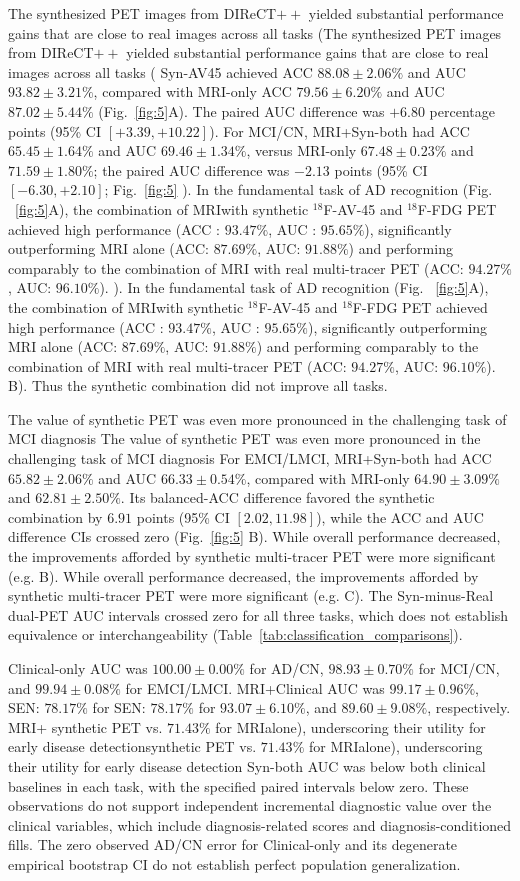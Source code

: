 \documentclass{article}
\providecommand{\DIFaddtex}[1]{{\protect\color{blue} \sf #1}} %
\providecommand{\DIFdeltex}[1]{{\protect\color{red} \ifmmode #1\else\scriptsize #1\fi}} %
\providecommand{\DIFaddbegin}{} %
\providecommand{\DIFaddend}{} %
\providecommand{\DIFdelbegin}{} %
\providecommand{\DIFdelend}{} %
\providecommand{\DIFadd}[1]{\texorpdfstring{\DIFaddtex{#1}}{#1}} %
\providecommand{\DIFdel}[1]{\texorpdfstring{\DIFdeltex{#1}}{}} %
\newcommand{\DIFscaledelfig}{0.5}
\newlength{\DIFdelgraphicswidth} %
\newlength{\DIFdelgraphicsheight} %
\newcommand{\DIFaddincludegraphics}[2][]{{\color{blue}\fbox{\DIFOincludegraphics[#1]{#2}}}} %
\newcommand{\DIFdelincludegraphics}[2][]{%
\sbox{\DIFdelgraphicsbox}{\DIFOincludegraphics[#1]{#2}}%
\settoboxwidth{\DIFdelgraphicswidth}{\DIFdelgraphicsbox} %
\settoboxtotalheight{\DIFdelgraphicsheight}{\DIFdelgraphicsbox} %
\scalebox{\DIFscaledelfig}{%
\parbox[b]{\DIFdelgraphicswidth}{\usebox{\DIFdelgraphicsbox}\\[-\baselineskip] \rule{\DIFdelgraphicswidth}{0em}}\llap{\resizebox{\DIFdelgraphicswidth}{\DIFdelgraphicsheight}{%
\setlength{\unitlength}{\DIFdelgraphicswidth}%
\begin{picture}(1,1)%
\thicklines\linethickness{2pt} %
{\color[rgb]{1,0,0}\put(0,0){\framebox(1,1){}}}%
{\color[rgb]{1,0,0}\put(0,0){\line( 1,1){1}}}%
{\color[rgb]{1,0,0}\put(0,1){\line(1,-1){1}}}%
\end{picture}%
}\hspace*{3pt}}} %
} %
\DeclareRobustCommand{\DIFaddbegin}{\DIFOaddbegin \let\includegraphics\DIFaddincludegraphics} %
\DeclareRobustCommand{\DIFaddend}{\DIFOaddend \let\includegraphics\DIFOincludegraphics} %
\DeclareRobustCommand{\DIFdelbegin}{\DIFOdelbegin \let\includegraphics\DIFdelincludegraphics} %
\DeclareRobustCommand{\DIFdelend}{\DIFOaddend \let\includegraphics\DIFOincludegraphics} %
\begin{document}
\DIFdel{The synthesized PET images from DIReCT$++$ yielded substantial performance gains that are close to real images across all tasks (}\DIFdelend \DIFaddbegin \DIFadd{Syn-AV45 achieved ACC $88.08\pm2.06\%$ and AUC $93.82\pm3.21\%$, compared with MRI-only ACC $79.56\pm6.20\%$ and AUC $87.02\pm5.44\%$ (Fig.~\ref{fig:5}A). The paired AUC difference was $+6.80$ percentage points (95\% CI $[+3.39,+10.22]$). For MCI/CN, MRI+Syn-both had ACC $65.45\pm1.64\%$ and AUC $69.46\pm1.34\%$, versus MRI-only $67.48\pm0.23\%$ and $71.59\pm1.80\%$; the paired AUC difference was $-2.13$ points (95\% CI $[-6.30,+2.10]$; }\DIFaddend Fig.~\ref{fig:5}\DIFdelbegin \DIFdel{). In the fundamental task of AD recognition (Fig.
~\ref{fig:5}A), the combination of MRIwith synthetic $^{18}$F-AV-45 and $^{18}$F-FDG PET achieved high performance (ACC : $93.47\%$, AUC : $95.65\%$), significantly outperforming MRI alone (ACC: $87.69\%$, AUC: $91.88\%$) and performing comparably to the combination of MRI with real multi-tracer PET (ACC: $94.27\%$, AUC: $96.10\%$).
}\DIFdelend \DIFaddbegin \DIFadd{B). Thus the synthetic combination did not improve all tasks.
}\DIFaddend 

\DIFdelbegin \DIFdel{The value of synthetic PET was even more pronounced in the challenging task of MCI diagnosis }\DIFdelend \DIFaddbegin \DIFadd{For EMCI/LMCI, MRI+Syn-both had ACC $65.82\pm2.06\%$ and AUC $66.33\pm0.54\%$, compared with MRI-only $64.90\pm3.09\%$ and $62.81\pm2.50\%$. Its balanced-ACC difference favored the synthetic combination by $6.91$ points (95\% CI $[2.02,11.98]$), while the ACC and AUC difference CIs crossed zero }\DIFaddend (Fig.~\ref{fig:5}\DIFdelbegin \DIFdel{B). While overall performance decreased, the improvements afforded by synthetic multi-tracer PET were more significant (e.g.
}\DIFdelend \DIFaddbegin \DIFadd{C). The Syn-minus-Real dual-PET AUC intervals crossed zero for all three tasks, which does not establish equivalence or interchangeability (Table~\ref{tab:classification_comparisons}).
}

\DIFadd{Clinical-only AUC was $100.00\pm0.00\%$ for AD/CN, $98.93\pm0.70\%$ for MCI/CN, and $99.94\pm0.08\%$ for EMCI/LMCI. MRI+Clinical AUC was $99.17\pm0.96\%$}\DIFaddend , \DIFdelbegin \DIFdel{SEN: $78.17\%$ for }\DIFdelend \DIFaddbegin \DIFadd{$93.07\pm6.10\%$, and $89.60\pm9.08\%$, respectively. }\DIFaddend MRI+\DIFdelbegin \DIFdel{synthetic PET vs. $71.43\%$ for MRIalone), underscoring their utility for early disease detection}\DIFdelend \DIFaddbegin \DIFadd{Syn-both AUC was below both clinical baselines in each task, with the specified paired intervals below zero. These observations do not support independent incremental diagnostic value over the clinical variables, which include diagnosis-related scores and diagnosis-conditioned fills. The zero observed AD/CN error for Clinical-only and its degenerate empirical bootstrap CI do not establish perfect population generalization}\DIFaddend .
\end{document}
